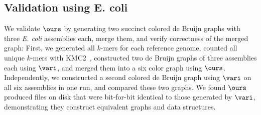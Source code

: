 













\subsection{Validation using E. coli}


We validate $\ours$ by generating two succinct colored de Bruijn graphs with three \emph{E. coli} assemblies each, merge them, and verify correctness of the merged graph:    First, we generated all $k$-mers for each reference genome, counted all unique $k$-mers with KMC2~\cite{deorowicz2015kmc}, constructed two de Bruijn graphs of three assemblies each using $\vari$, and merged them into a six color graph using $\ours$.  Independently, we constructed a second colored de Bruijn graph using $\vari$ on all six assemblies in one run, and compared these two graphs.  We found $\ours$ produced files on disk that were bit-for-bit identical to those generated by $\vari$, demonstrating they construct equivalent graphs and data structures.

